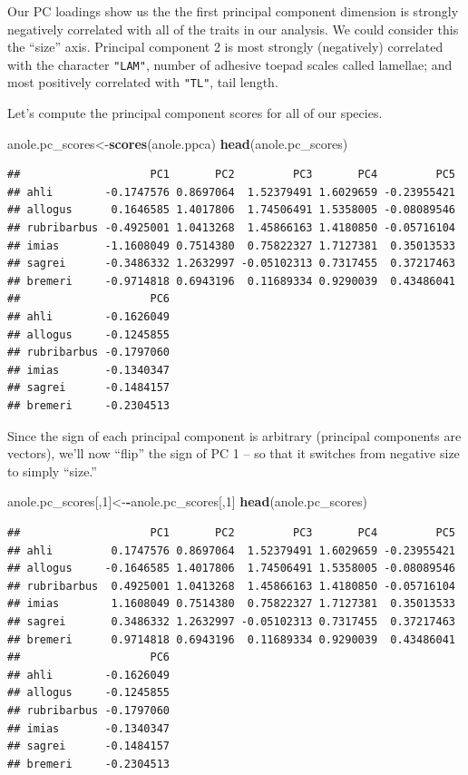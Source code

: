 \documentclass[fleqn,10pt,lineno]{wlpeerj}
\newenvironment{Shaded}{\begin{snugshade}}{\end{snugshade}}
\newcommand{\DecValTok}[1]{\textcolor[rgb]{0.00,0.00,0.81}{#1}}
\newcommand{\FunctionTok}[1]{\textcolor[rgb]{0.13,0.29,0.53}{\textbf{#1}}}
\newcommand{\NormalTok}[1]{#1}
\newcommand{\OtherTok}[1]{\textcolor[rgb]{0.56,0.35,0.01}{#1}}
\newcommand{\SpecialCharTok}[1]{\textcolor[rgb]{0.81,0.36,0.00}{\textbf{#1}}}
\begin{document}
Our PC loadings show us the the first principal component dimension is
strongly negatively correlated with all of the traits in our analysis.
We could consider this the ``size'' axis. Principal component 2 is most
strongly (negatively) correlated with the character \texttt{"LAM"},
number of adhesive toepad scales called lamellae; and most positively
correlated with \texttt{"TL"}, tail length.

Let's compute the principal component scores for all of our species.

\begin{Shaded}
\begin{Highlighting}[]
\NormalTok{anole.pc\_scores}\OtherTok{\textless{}{-}}\FunctionTok{scores}\NormalTok{(anole.ppca)}
\FunctionTok{head}\NormalTok{(anole.pc\_scores)}
\end{Highlighting}
\end{Shaded}

\begin{verbatim}
##                    PC1       PC2         PC3       PC4         PC5
## ahli        -0.1747576 0.8697064  1.52379491 1.6029659 -0.23955421
## allogus      0.1646585 1.4017806  1.74506491 1.5358005 -0.08089546
## rubribarbus -0.4925001 1.0413268  1.45866163 1.4180850 -0.05716104
## imias       -1.1608049 0.7514380  0.75822327 1.7127381  0.35013533
## sagrei      -0.3486332 1.2632997 -0.05102313 0.7317455  0.37217463
## bremeri     -0.9714818 0.6943196  0.11689334 0.9290039  0.43486041
##                    PC6
## ahli        -0.1626049
## allogus     -0.1245855
## rubribarbus -0.1797060
## imias       -0.1340347
## sagrei      -0.1484157
## bremeri     -0.2304513
\end{verbatim}

Since the sign of each principal component is arbitrary (principal
components are vectors), we'll now ``flip'' the sign of PC 1 -- so that
it switches from negative size to simply ``size.''

\begin{Shaded}
\begin{Highlighting}[]
\NormalTok{anole.pc\_scores[,}\DecValTok{1}\NormalTok{]}\OtherTok{\textless{}{-}}\SpecialCharTok{{-}}\NormalTok{anole.pc\_scores[,}\DecValTok{1}\NormalTok{]}
\FunctionTok{head}\NormalTok{(anole.pc\_scores)}
\end{Highlighting}
\end{Shaded}

\begin{verbatim}
##                    PC1       PC2         PC3       PC4         PC5
## ahli         0.1747576 0.8697064  1.52379491 1.6029659 -0.23955421
## allogus     -0.1646585 1.4017806  1.74506491 1.5358005 -0.08089546
## rubribarbus  0.4925001 1.0413268  1.45866163 1.4180850 -0.05716104
## imias        1.1608049 0.7514380  0.75822327 1.7127381  0.35013533
## sagrei       0.3486332 1.2632997 -0.05102313 0.7317455  0.37217463
## bremeri      0.9714818 0.6943196  0.11689334 0.9290039  0.43486041
##                    PC6
## ahli        -0.1626049
## allogus     -0.1245855
## rubribarbus -0.1797060
## imias       -0.1340347
## sagrei      -0.1484157
## bremeri     -0.2304513
\end{verbatim}
\end{document}
